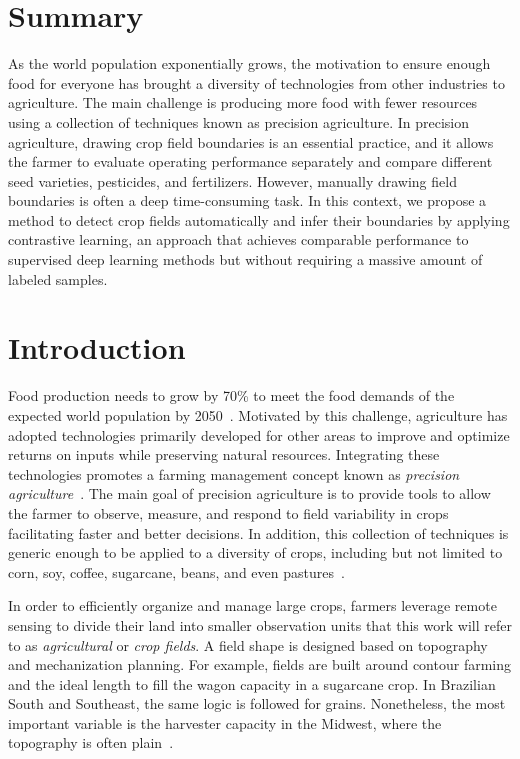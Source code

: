 \documentclass[12pt]{article}
\begin{document}
	\newpage
	\baselineskip
	\setcounter{page}{1}

\section*{Summary}

As the world population exponentially grows, the motivation to ensure enough food for everyone has brought a diversity of technologies from other industries to agriculture. The main challenge is producing more food with fewer resources using a collection of techniques known as precision agriculture. In precision agriculture, drawing crop field boundaries is an essential practice, and it allows the farmer to evaluate operating performance separately and compare different seed varieties, pesticides, and fertilizers. However, manually drawing field boundaries is often a deep time-consuming task. In this context, we propose a method to detect crop fields automatically and infer their boundaries by applying  contrastive learning, an approach that achieves comparable performance to supervised deep learning methods but without requiring a massive amount of labeled samples.

\section{Introduction}\label{section:introduction}

Food production needs to grow by 70\% to meet the food demands of the expected world population by 2050~\cite{nelson2010}. Motivated by this challenge, agriculture has adopted technologies primarily developed for other areas to improve and optimize returns on inputs while preserving natural resources. Integrating these technologies promotes a farming management concept known as \textit{precision agriculture}~\cite{zhang2002}. The main goal of precision agriculture is to provide tools to allow the farmer to observe, measure, and respond to field variability in crops facilitating faster and better decisions. In addition, this collection of techniques is generic enough to be applied to a diversity of crops, including but not limited to corn, soy, coffee, sugarcane, beans, and even pastures~\cite{mulla2013,bhakta2019}.

In order to efficiently organize and manage large crops, farmers leverage remote sensing to divide their land into smaller observation units that this work will refer to as \textit{agricultural} or \textit{crop fields}. A field shape is designed based on topography and mechanization planning. For example, fields are built around contour farming and the ideal length to fill the wagon capacity in a sugarcane crop. In Brazilian South and Southeast, the same logic is followed for grains. Nonetheless, the most important variable is the harvester capacity in the Midwest, where the topography is often plain~\cite{spekken2015,griffel2019,bolfe2020}.
\end{document}
